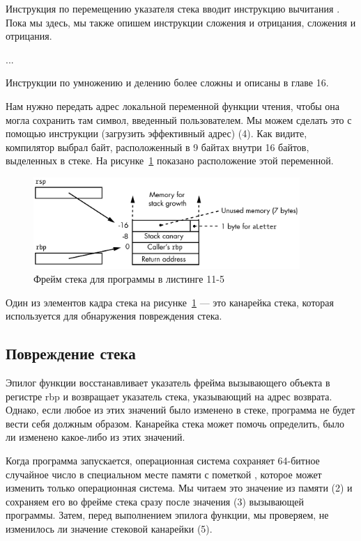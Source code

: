 Инструкция по перемещению указателя стека вводит инструкцию вычитания . Пока мы здесь, мы также опишем инструкции сложения и отрицания, сложения и отрицания.

...

Инструкции по умножению и делению более сложны и описаны в главе 16.

Нам нужно передать адрес локальной переменной  функции чтения, чтобы она могла сохранить там символ, введенный пользователем. Мы можем сделать это с помощью инструкции  (загрузить эффективный адрес) (4). Как видите, компилятор выбрал байт, расположенный в 9 байтах внутри 16 байтов, выделенных в стеке. На рисунке~\ref{fig11-4} показано расположение этой переменной.

\begin{figure}[htbp]
    \centering
    \includegraphics[width=0.9\textwidth]{img/fig11-4.png}
    \caption{Фрейм стека для программы в листинге 11-5}
    \label{fig11-4}
\end{figure}


Один из элементов кадра стека на рисунке~\ref{fig11-4} — это канарейка стека, которая используется для обнаружения повреждения стека.

\subsection{Повреждение стека}

Эпилог функции восстанавливает указатель фрейма вызывающего объекта в регистре rbp и возвращает указатель стека, указывающий на адрес возврата. Однако, если любое из этих значений было изменено в стеке, программа не будет вести себя должным образом. Канарейка стека может помочь определить, было ли изменено какое-либо из этих значений.

Когда программа запускается, операционная система сохраняет 64-битное случайное число в специальном месте памяти с пометкой , которое может изменить только операционная система. Мы читаем это значение из памяти (2) и сохраняем его во фрейме стека сразу после значения  (3) вызывающей программы. Затем, перед выполнением эпилога функции, мы проверяем, не изменилось ли значение стековой канарейки (5).

